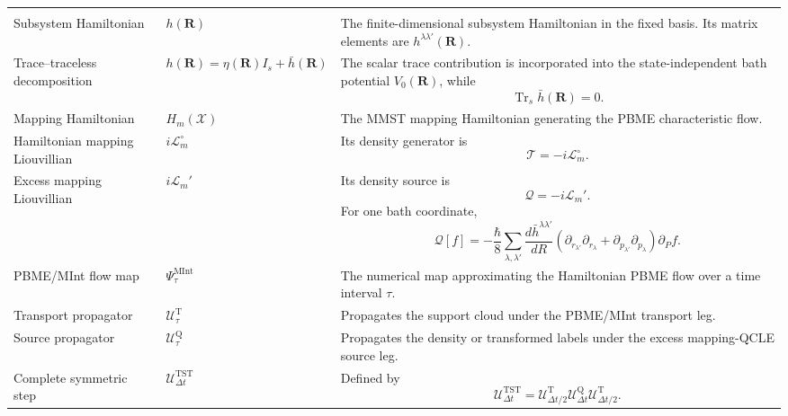 \documentclass[
  11pt,
  letterpaper,
  onehalfspacing,
  normalmargins,
  equalmargins,
  oneside
]{ut-thesis}
\begin{document}
\begin{longtable}{
@{}
>{\raggedright\arraybackslash}p{}
>{\raggedright\arraybackslash}p{}
>{\raggedright\arraybackslash}p{}
@{}
}

\addlinespace[0.6em]
\multicolumn{3}{@{}l}{
\textbf{Hamiltonians, Liouvillians, and propagators}
}
\\
\addlinespace[0.3em]

Subsystem Hamiltonian
&
\(h(\mathbf R)\)
&
The finite-dimensional subsystem Hamiltonian in the fixed basis.
Its matrix elements are \(h^{\lambda\lambda'}(\mathbf R)\).
\\

Trace--traceless decomposition
&
\(h(\mathbf R)=\eta(\mathbf R)I_s+\bar h(\mathbf R)\)
&
The scalar trace contribution is incorporated into the state-independent
bath potential \(V_0(\mathbf R)\), while
\[
\operatorname{Tr}_s\bar h(\mathbf R)=0.
\]
\\

Mapping Hamiltonian
&
\(H_m(\boldsymbol{\mathcal X})\)
&
The MMST mapping Hamiltonian generating the PBME characteristic flow.
\\

Hamiltonian mapping Liouvillian
&
\(i\mathcal L_m^\circ\)
&
Its density generator is
\[
\mathcal T=-i\mathcal L_m^\circ.
\]
\\

Excess mapping Liouvillian
&
\(i\mathcal L_m'\)
&
Its density source is
\[
\mathcal Q=-i\mathcal L_m'.
\]
For one bath coordinate,
\[
\mathcal Q[f]
=
-\frac{\hbar}{8}
\sum_{\lambda,\lambda'}
\frac{d\bar h^{\lambda\lambda'}}{dR}
\left(
\partial_{r_{\lambda'}}
\partial_{r_\lambda}
+
\partial_{p_{\lambda'}}
\partial_{p_\lambda}
\right)
\partial_P f.
\]
\\

PBME/MInt flow map
&
\(\Psi_\tau^{\mathrm{MInt}}\)
&
The numerical map approximating the Hamiltonian PBME flow over a time
interval \(\tau\).
\\

Transport propagator
&
\(\mathcal U_\tau^{\mathrm T}\)
&
Propagates the support cloud under the PBME/MInt transport leg.
\\

Source propagator
&
\(\mathcal U_\tau^{\mathrm Q}\)
&
Propagates the density or transformed labels under the excess
mapping-QCLE source leg.
\\

Complete symmetric step
&
\(\mathcal U_{\Delta t}^{\mathrm{TST}}\)
&
Defined by
\[
\mathcal U_{\Delta t}^{\mathrm{TST}}
=
\mathcal U_{\Delta t/2}^{\mathrm T}
\mathcal U_{\Delta t}^{\mathrm Q}
\mathcal U_{\Delta t/2}^{\mathrm T}.
\]
\\


\end{longtable}
\end{document}
